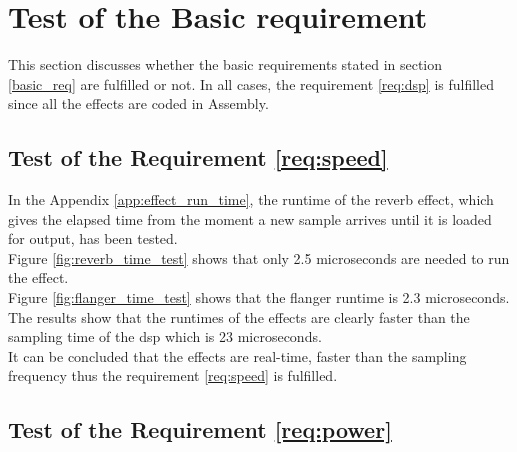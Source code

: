 \section{Test of the Basic requirement}
This section discusses whether the basic requirements stated in section \ref{basic_req} are fulfilled or not. 
In all cases, the requirement \ref{req:dsp} is fulfilled since all the effects are coded in Assembly.


\subsection{Test of the Requirement \autoref{req:speed}}

In the Appendix \ref{app:effect_run_time}, the runtime of the reverb effect, which gives the elapsed time from the moment a new sample arrives until it is loaded for output, has been tested. \\
Figure \ref{fig:reverb_time_test} shows that only 2.5 microseconds are needed to run the effect. \\
Figure \ref{fig:flanger_time_test} shows that the flanger runtime is 2.3 microseconds. \\
The results show that the runtimes of the effects are clearly faster than the sampling time of the \gls{dsp} which is 23 microseconds. \\
It can be concluded that the effects are real-time, faster than the sampling frequency thus the requirement \ref{req:speed} is fulfilled. \\






\subsection{Test of the Requirement \autoref{req:power}}